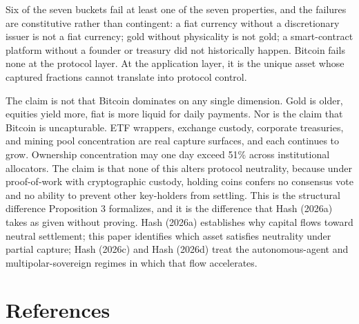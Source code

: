 \documentclass[12pt]{article}
\theoremstyle{definition}
\theoremstyle{remark}
\begin{document}
Six of the seven buckets fail at least one of the seven properties,
and the failures are constitutive rather than contingent: a fiat
currency without a discretionary issuer is not a fiat currency; gold
without physicality is not gold; a smart-contract platform without a
founder or treasury did not historically happen. Bitcoin fails none at
the protocol layer. At the application layer, it is the unique asset
whose captured fractions cannot translate into protocol control.

The claim is not that Bitcoin dominates on any single dimension. Gold
is older, equities yield more, fiat is more liquid for daily payments.
Nor is the claim that Bitcoin is uncapturable. ETF wrappers, exchange
custody, corporate treasuries, and mining pool concentration are real
capture surfaces, and each continues to grow. Ownership concentration
may one day exceed 51\% across institutional allocators. The claim is that
none of this alters protocol neutrality, because under proof-of-work
with cryptographic custody, holding coins confers no consensus vote
and no ability to prevent other key-holders from settling. This is the
structural difference Proposition 3 formalizes, and it is the
difference that Hash (2026a) takes as given without proving. Hash
(2026a) establishes why capital flows toward neutral settlement; this
paper identifies which asset satisfies neutrality under partial
capture; Hash (2026c) and Hash (2026d) treat the autonomous-agent and
multipolar-sovereign regimes in which that flow accelerates.
\section{References}
\end{document}
